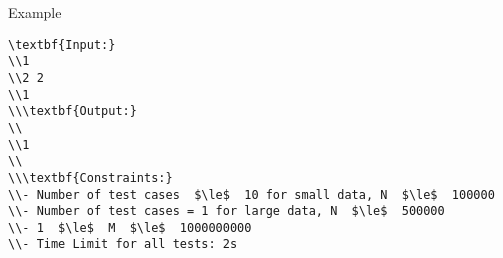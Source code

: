 Example
\begin{verbatim}
\textbf{Input:}
\\1
\\2 2
\\1
\\\textbf{Output:}
\\
\\1
\\
\\\textbf{Constraints:}
\\- Number of test cases  $\le$  10 for small data, N  $\le$  100000
\\- Number of test cases = 1 for large data, N  $\le$  500000
\\- 1  $\le$  M  $\le$  1000000000
\\- Time Limit for all tests: 2s\end{verbatim}